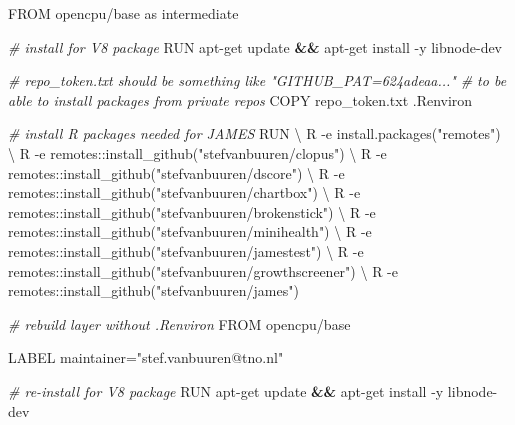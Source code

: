 \documentclass[
]{book}
\newenvironment{Shaded}{\begin{snugshade}}{\end{snugshade}}
\newcommand{\AttributeTok}[1]{\textcolor[rgb]{0.77,0.63,0.00}{#1}}
\newcommand{\CommentTok}[1]{\textcolor[rgb]{0.56,0.35,0.01}{\textit{#1}}}
\newcommand{\DataTypeTok}[1]{\textcolor[rgb]{0.13,0.29,0.53}{#1}}
\newcommand{\ExtensionTok}[1]{#1}
\newcommand{\KeywordTok}[1]{\textcolor[rgb]{0.13,0.29,0.53}{\textbf{#1}}}
\newcommand{\NormalTok}[1]{#1}
\newcommand{\StringTok}[1]{\textcolor[rgb]{0.31,0.60,0.02}{#1}}
\begin{document}
\begin{Shaded}
\begin{Highlighting}[]
\ExtensionTok{FROM}\NormalTok{ opencpu/base as intermediate}

\CommentTok{\# install for V8 package}
\ExtensionTok{RUN}\NormalTok{ apt{-}get update }\KeywordTok{\&\&} \ExtensionTok{apt{-}get}\NormalTok{ install }\AttributeTok{{-}y}\NormalTok{ libnode{-}dev}

\CommentTok{\# repo\_token.txt should be something like "GITHUB\_PAT=624adeaa..."}
\CommentTok{\# to be able to install packages from private repo\textquotesingle{}s}
\ExtensionTok{COPY}\NormalTok{ repo\_token.txt .Renviron}

\CommentTok{\# install R packages needed for JAMES}
\ExtensionTok{RUN} \DataTypeTok{\textbackslash{}}
\NormalTok{    R }\AttributeTok{{-}e} \StringTok{\textquotesingle{}install.packages("remotes")\textquotesingle{}} \DataTypeTok{\textbackslash{}}
\NormalTok{    R }\AttributeTok{{-}e} \StringTok{\textquotesingle{}remotes::install\_github("stefvanbuuren/clopus")\textquotesingle{}} \DataTypeTok{\textbackslash{}}
\NormalTok{    R }\AttributeTok{{-}e} \StringTok{\textquotesingle{}remotes::install\_github("stefvanbuuren/dscore")\textquotesingle{}} \DataTypeTok{\textbackslash{}}
\NormalTok{    R }\AttributeTok{{-}e} \StringTok{\textquotesingle{}remotes::install\_github("stefvanbuuren/chartbox")\textquotesingle{}} \DataTypeTok{\textbackslash{}}
\NormalTok{    R }\AttributeTok{{-}e} \StringTok{\textquotesingle{}remotes::install\_github("stefvanbuuren/brokenstick")\textquotesingle{}} \DataTypeTok{\textbackslash{}}
\NormalTok{    R }\AttributeTok{{-}e} \StringTok{\textquotesingle{}remotes::install\_github("stefvanbuuren/minihealth")\textquotesingle{}} \DataTypeTok{\textbackslash{}}
\NormalTok{    R }\AttributeTok{{-}e} \StringTok{\textquotesingle{}remotes::install\_github("stefvanbuuren/jamestest")\textquotesingle{}} \DataTypeTok{\textbackslash{}}
\NormalTok{    R }\AttributeTok{{-}e} \StringTok{\textquotesingle{}remotes::install\_github("stefvanbuuren/growthscreener")\textquotesingle{}} \DataTypeTok{\textbackslash{}}
\NormalTok{    R }\AttributeTok{{-}e} \StringTok{\textquotesingle{}remotes::install\_github("stefvanbuuren/james")\textquotesingle{}}

\CommentTok{\# rebuild layer without .Renviron}
\ExtensionTok{FROM}\NormalTok{ opencpu/base}

\ExtensionTok{LABEL}\NormalTok{ maintainer=}\StringTok{"stef.vanbuuren@tno.nl"} 

\CommentTok{\# re{-}install for V8 package}
\ExtensionTok{RUN}\NormalTok{ apt{-}get update }\KeywordTok{\&\&} \ExtensionTok{apt{-}get}\NormalTok{ install }\AttributeTok{{-}y}\NormalTok{ libnode{-}dev}


\end{Highlighting}
\end{Shaded}
\end{document}
